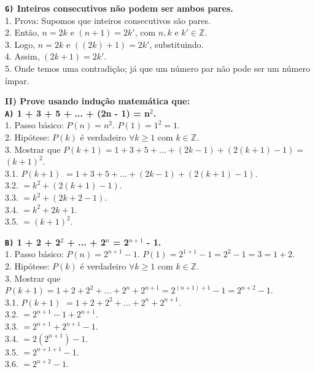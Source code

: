 \documentclass[12pt, a4paper]{article}
\newcommand{\Z}{\mathbb{Z}}
\newcommand\tab[1][1cm]{\hspace*{#1}}
\begin{document}
\begin{flushleft}
\vskip9mm
\textbf{\textbf{\texttt{G)}} Inteiros consecutivos não podem ser ambos pares.\\}
\textsf{1. Prova: Supomos que inteiros consecutivos são pares. 
\\2. Então, $n = 2k$ e $(n+1) = 2k'$, com $n, k$ e $k' \in \Z$.
\\3. Logo, $n = 2k$ e $((2k)+1) = 2k'$, substituindo.
\\4. Assim, $(2k + 1) = 2k'$.
\\5. Onde temos uma contradição; já que um número par não pode ser um número ímpar.}

\vskip10mm
\textbf{II) Prove usando indução matemática que: \\}
\vskip5mm
\textbf{\textbf{\texttt{A)}} 1 + 3 + 5 + ... + (2n - 1) = n$^{2}$.\\}
\textsf{1. Passo básico: $P(n) = n^2$. $P(1) = 1^2 =1$. 
\\2. Hipótese: $P(k)$ é verdadeiro $ \forall k \geq 1 $ com $k \in \Z$.
\\3. Mostrar que $P(k+1)= 1+3+5+...+(2k-1) + (2(k+1) -1) =$ $\boxed{(k+1)^2}$.
\\3.1. $P(k+1)$ $=1+3+5+...+(2k-1)+(2(k+1)-1)$.
\\3.2.\tab \tab[0.75cm] $= k^2+(2(k+1)-1)$.
\\3.3.\tab \tab[0.75cm] $= k^2+(2k+2-1)$.
\\3.4.\tab \tab[0.75cm] $=k^2+2k+1$.
\\3.5.\tab \tab[0.75cm]  $= \boxed{(k+1)^2}$.}

\pagebreak

\textbf{\textbf{\texttt{B)}} 1 + 2 + 2$^2$ + ... + 2$^n$ = 2$^{n+1}$ - 1.\\}
\textsf{1. Passo básico: $P(n) = 2^{n+1} - 1$. $P(1) = 2^{1+1} - 1 = 2^{2} - 1 = 3 =1+2$.
\\2. Hipótese: $P(k)$ é verdadeiro $ \forall k \geq 1 $ com $k \in \Z$.
\\3. Mostrar que $P(k+1) = 1 +2+2^2+...+2^n + 2^{n+1}=2^{(n+1)+1}-1= \boxed{2^{n+2}-1}$.
\\3.1. $P(k+1)$ $=1 +2+2^2+...+2^n + 2^{n+1}$.
\\3.2.\tab \tab[0.75cm] $= 2^{n+1}-1 + 2^{n+1}$.
\\3.3.\tab \tab[0.75cm] $= 2^{n+1} + 2^{n+1} - 1$.
\\3.4.\tab \tab[0.75cm] $= 2(2^{n+1}) - 1$.
\\3.5.\tab \tab[0.75cm] $= 2^{n+1+1} - 1$.
\\3.6.\tab \tab[0.75cm] $= \boxed{2^{n+2} - 1}$.}


\end{flushleft}
\end{document}

